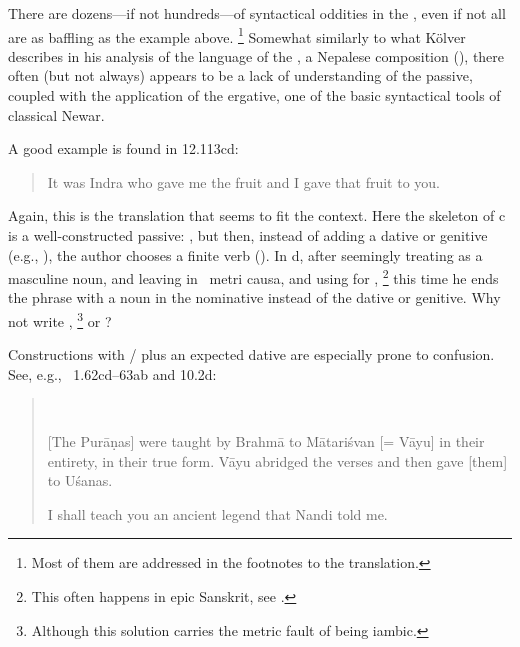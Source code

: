 There are dozens---if not hundreds---of syntactical oddities in the \VSS,
even if not all are as baffling as the example above.%
		\footnote{Most of them are addressed in the footnotes to the translation.}
Somewhat similarly to what Kölver describes in 
his analysis of the language of the \SvayP, a Nepalese composition (),
there often (but not always) appears to be a lack of understanding of the
passive,\label{confusedpassive} 
coupled with the application of the ergative,\label{ergative} one of the
basic syntactical tools of classical Newar. 

A good example is found in 12.113cd:

\begin{quote}

It was Indra who gave me the fruit and I gave that fruit to you.
\end{quote}

\noindent
Again, this is the translation that seems to fit the context. 
Here the skeleton of  c is a well-constructed passive:
, but then, instead of adding a dative or 
genitive (e.g., ), the author chooses 
a finite verb (). In  d, after seemingly 
treating  as a masculine noun, and leaving
 in \stemform\ metri causa, and using  for ,%
		\footnote{This often happens in epic Sanskrit, see 
			.}
this time he ends the phrase with a noun in the nominative  instead of
the dative or genitive. Why not write ,%
		\footnote{Although this solution carries the metric fault of being iambic.}
or ?

\label{kathita}Constructions with / plus an expected dative 
are especially prone to confusion. See, e.g., \VSS\ 1.62cd--63ab and 10.2d:

\begin{quote}
\\

        [The Purāṇas] were taught by Brahmā to 
        Mātariśvan [= Vāyu] in their entirety, in their true form.
        Vāyu abridged the verses and then gave [them] to Uśanas.
        

        I shall teach you an ancient legend that Nandi told me.
\end{quote}

